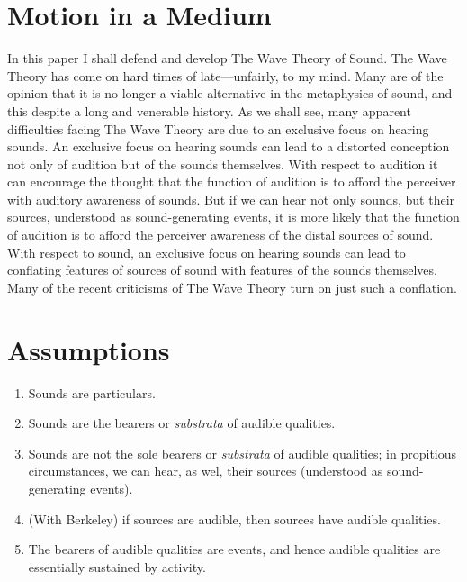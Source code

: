 \documentclass[12pt]{article}
\title{\mytitle}
\author{\myauthor}
\date{} %
\begin{document}
\maketitle

\setlength{\parindent}{1em}


\section{Motion in a Medium} %
\label{sec:motion_in_a_medium}

In this paper I shall defend and develop The Wave Theory of Sound. The Wave Theory has come on hard times of late---unfairly, to my mind. Many are of the opinion that it is no longer a viable alternative in the metaphysics of sound, and this despite a long and venerable history. As we shall see, many apparent difficulties facing The Wave Theory are due to an exclusive focus on hearing sounds. An exclusive focus on hearing sounds can lead to a distorted conception not only of audition but of the sounds themselves. With respect to audition it can encourage the thought that the function of audition is to afford the perceiver with auditory awareness of sounds. But if we can hear not only sounds, but their sources, understood as sound-generating events, it is more likely that the function of audition is to afford the perceiver awareness of the distal sources of sound. With respect to sound, an exclusive focus on hearing sounds can lead to conflating features of sources of sound with features of the sounds themselves. Many of the recent criticisms of The Wave Theory turn on just such a conflation.


\section{Assumptions} %
\label{sec:section_name}

\begin{enumerate}
	\item Sounds are particulars.
	\item Sounds are the bearers or \emph{substrata} of audible qualities.
	\item Sounds are not the sole bearers or \emph{substrata} of audible qualities; in propitious circumstances, we can hear, as wel, their sources (understood as sound-generating events).
	\item (With Berkeley) if sources are audible, then sources have audible qualities.
	\item The bearers of audible qualities are events, and hence audible qualities are essentially sustained by activity.
\end{enumerate}
\end{document}
